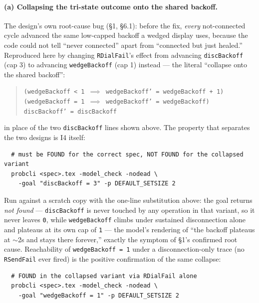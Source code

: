 \documentclass[a4paper,10pt,fleqn]{article}
\begin{document}
\paragraph{(a) Collapsing the tri-state outcome onto the shared backoff.}
The design's own root-cause bug (\S1, \S6.1): before the fix,
\emph{every} not-connected cycle advanced the same low-capped backoff a
wedged display uses, because the code could not tell ``never connected''
apart from ``connected but just healed.''  Reproduced here by changing
\texttt{RDialFail}'s effect from advancing \texttt{discBackoff} (cap 3) to
advancing \texttt{wedgeBackoff} (cap 1) instead --- the literal
``collapse onto the shared backoff'':
\begin{quote}
  \texttt{(wedgeBackoff < 1 \(\implies\) wedgeBackoff' = wedgeBackoff + 1)} \\
  \texttt{(wedgeBackoff = 1 \(\implies\) wedgeBackoff' = wedgeBackoff)} \\
  \texttt{discBackoff' = discBackoff}
\end{quote}
in place of the two \texttt{discBackoff} lines shown above.  The property
that separates the two designs is I4 itself:
\begin{verbatim}
  # must be FOUND for the correct spec, NOT FOUND for the collapsed variant
  probcli <spec>.tex -model_check -nodead \
    -goal "discBackoff = 3" -p DEFAULT_SETSIZE 2
\end{verbatim}
Run against a scratch copy with the one-line substitution above: the goal
returns \emph{not found} --- \texttt{discBackoff} is never touched by any
operation in that variant, so it never leaves \texttt{0}, while
\texttt{wedgeBackoff} climbs under sustained disconnection alone and
plateaus at its own cap of \texttt{1} --- the model's rendering of ``the
backoff plateaus at $\sim$2s and stays there forever,'' exactly the
symptom of \S1's confirmed root cause. Reachability of
\texttt{wedgeBackoff = 1} under a disconnection-only trace (no
\texttt{RSendFail} ever fired) is the positive confirmation of the same
collapse:
\begin{verbatim}
  # FOUND in the collapsed variant via RDialFail alone
  probcli <spec>.tex -model_check -nodead \
    -goal "wedgeBackoff = 1" -p DEFAULT_SETSIZE 2
\end{verbatim}
\end{document}
